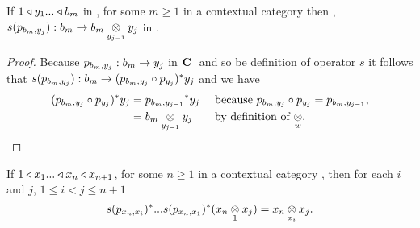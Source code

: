 \begin{lemma}
If $1 \base y_1 ... \base b_m$ in \catc, for some $m \ge 1$ in a contextual category \catcw then \foreachj,
$s(p_{b_m,y_j}): b_m \morph \crossx{b_m}{y_j}{y_{j-1}}$ in \catcw.
\end{lemma}
\begin{proof}
Because $p_{b_m,y_j}: b_m \morph y_j$ in $\catcw$ and so be definition of operator $s$ it follows that $s(p_{b_m,y_j}): b_m  \morph (p_{b_m,y_j} \circ p_{y_j})^*y_j$
and we have 
\begin{align*}
(p_{b_m,y_j} \circ p_{y_j})^*y_j &= {p_{b_m,y_{j-1}}} ^*y_j  && \mbox{ because $p_{b_m,y_j} \circ p_{y_j}=p_{b_m,y_{j-1}}$,} \\
                                 &= \crossx{b_m}{y_j}{y_{j-1}} && \mbox{ by definition of $\crossx{}{}{w}$}.
\end{align*}
\end{proof}
\begin{lemma}
If $1 \base x_1 ... \base x_n \base x_{n+1}$, for some $n \ge 1$ in a contextual category \catc, then 
for each $i$ and $j$, $1 \leq i < j \leq n+1$
\begin{equation*}
s(p_{x_{n},x_{i}})^*...s(p_{x_{n},x_1})^*(\crossx{x_{n}}{x_j}{1}) 
= \crossx{x_{n}}{x_j}{x_{i}}.
\end{equation*} 
\end{lemma}
